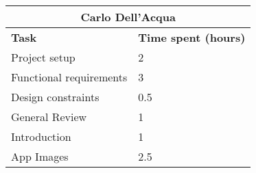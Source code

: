 \begin{table}[h]
  \centering
  \begin{tabular}{l|l}
    \multicolumn{2}{c}{\textbf{Carlo Dell'Acqua}} \\
    \hline
    \textbf{Task} & \textbf{Time spent (hours)}\\
    \hline
    Project setup & 2 \\
    Functional requirements & 3 \\
    Design constraints & 0.5 \\
    General Review & 1 \\
    Introduction & 1 \\
    App Images & 2.5 \\
  \end{tabular}
\end{table}